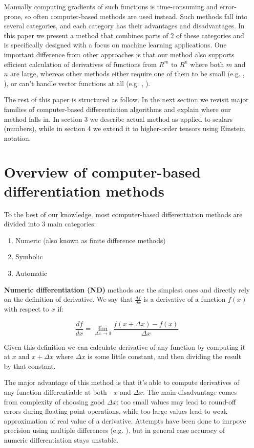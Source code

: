 \documentclass[conference]{IEEEtran}
\begin{document}
Manually computing gradients of such functions is time-consuming and
error-prone, so often computer-based methods are used instead. Such
methods fall into several categories, and each category has their
advantages and disadvantages. In this paper we present a method that
combines parts of 2 of these categories and is specifically designed
with a focus on machine learning applications. One important
difference from other approaches is that our method also supports
efficient calculation of derivatives of functions from $R^m$ to $R^n$
where both $m$ and $n$ are large, whereas other methods either require
one of them to be small (e.g. \cite{ForwardDiff}, \cite{Stan}), or
can't handle vector functions at all (e.g. \cite{Mathematica},
\cite{SymPy}).

The rest of this paper is structured as follow. In the next section we
revisit major families of computer-based differentiation algorithms
and explain where our method falls in. In section 3 we describe actual
method as applied to scalars (numbers), while in section 4 we extend
it to higher-order tensors using Einstein notation.


\section{Overview of computer-based differentiation methods}

To the best of our knowledge, most computer-based differentiation
methods are divided into 3 main categories:

\begin{enumerate}
\item Numeric (also known as finite difference methods)
\item Symbolic
\item Automatic
\end{enumerate}


\textbf{Numeric differentiation (ND)} methods are the simplest ones
and directly rely on the definition of derivative. We say that
$\frac{df}{dx}$ is a derivative of a function $f(x)$ with respect to
$x$ if:

$$\frac{df}{dx} = \lim_{\Delta x \to 0} \frac{f(x + \Delta x) - f(x)}{\Delta x}$$

Given this definition we can calculate derivative of any function by
computing it at $x$ and $x + \Delta x$ where $\Delta x$ is some little
constant, and then dividing the result by that constant.

The major advantage of this method is that it's able to compute
derivatives of any function differentiable at both - $x$ and
$\Delta x$. The main disadvantage comes from complexity of choosing
good $\Delta x$: too small values may lead to round-off errors during
floating point operations, while too large values lead to weak
approximation of real value of a derivative. Attempts have been done
to imrpove precision using multiple differences
(e.g. \cite{fornberg1988}), but in general case accuracy of numeric
differentiation stays unstable.
\end{document}

